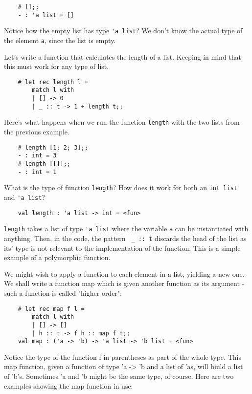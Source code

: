 \begin{lstlisting}
    # [];;
    - : 'a list = []
\end{lstlisting}
Notice how the empty list has type \lstinline{'a list}? We don't know the actual type of the element \lstinline{a}, since the list is empty.

Let's write a function that calculates the length of a list. Keeping in mind that this must work for any type of list. 

\begin{lstlisting}
    # let rec length l =
        match l with
        | [] -> 0
        | _ :: t -> 1 + length t;;
\end{lstlisting}

Here's what happens when we run the function \lstinline{length} with the two lists from the previous example.

\begin{lstlisting}
    # length [1; 2; 3];;
    - : int = 3
    # length [[]];;
    - : int = 1
\end{lstlisting}

What is the type of function \lstinline{length}? How does it work for both an \lstinline{int list} and \lstinline{'a list}?

\begin{lstlisting}
    val length : 'a list -> int = <fun>
\end{lstlisting}

\lstinline{length} takes a list of type \lstinline{'a list} where the variable \lstinline{a} can be instantiated with anything. Then, in the code, the pattern \lstinline{ _ :: t} discards the head of the list as its' type is not relevant to the implementation of the function. This is a simple example of a polymorphic function.

We might wish to apply a function to each element in a list, yielding a new one. We shall write a function map which is given another function as its argument - such a function is called "higher-order":

\begin{lstlisting}
    # let rec map f l =
        match l with
        | [] -> []
        | h :: t -> f h :: map f t;;
    val map : ('a -> 'b) -> 'a list -> 'b list = <fun>
\end{lstlisting}

Notice the type of the function f in parentheses as part of the whole type. This map function, given a function of type 'a -> 'b and a list of 'as, will build a list of 'b's. Sometimes 'a and 'b might be the same type, of course. Here are two examples showing the map function in use:

